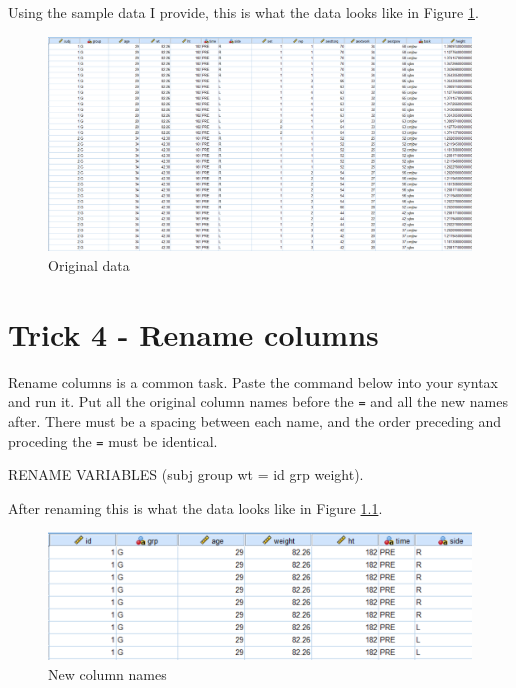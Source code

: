 \documentclass[
]{book}
\newenvironment{Shaded}{\begin{snugshade}}{\end{snugshade}}
\newcommand{\AttributeTok}[1]{\textcolor[rgb]{0.77,0.63,0.00}{#1}}
\newcommand{\FunctionTok}[1]{\textcolor[rgb]{0.00,0.00,0.00}{#1}}
\newcommand{\NormalTok}[1]{#1}
\begin{document}
Using the sample data I provide, this is what the data looks like in Figure \ref{fig:original}.

\begin{figure}
\includegraphics[width=1\linewidth]{images/original_data} \caption{Original data}\label{fig:original}
\end{figure}

\hypertarget{trick4}{%
\chapter{Trick 4 - Rename columns}\label{trick4}}

Rename columns is a common task. Paste the command below into your syntax and run it. Put all the original column names before the \texttt{=} and all the new names after. There must be a spacing between each name, and the order preceding and proceding the \texttt{=} must be identical.

\begin{Shaded}
\begin{Highlighting}[]
\NormalTok{RENAME }\FunctionTok{VARIABLES}\NormalTok{ (subj group }\AttributeTok{wt  =}\NormalTok{ id grp weight).}
\end{Highlighting}
\end{Shaded}

After renaming this is what the data looks like in Figure \ref{fig:rename-col}.

\begin{figure}
\includegraphics[width=1\linewidth]{images/rename} \caption{New column names}\label{fig:rename-col}
\end{figure}
\end{document}
